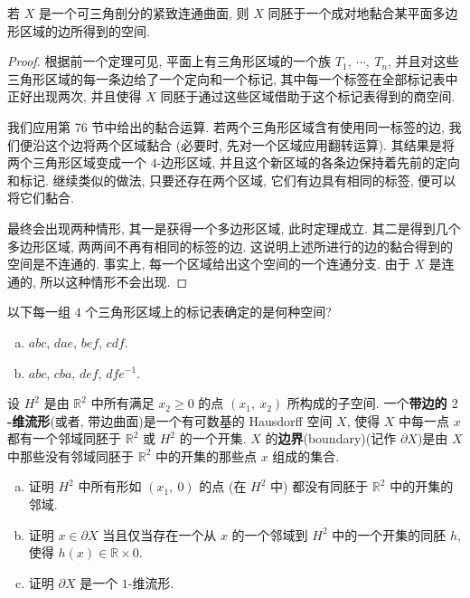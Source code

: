 \begin{theorem}[紧致连通曲面的多边形表示]
\label{theorem:ch12-polygon-representation}
若 $X$ 是一个可三角剖分的紧致连通曲面, 则 $X$ 同胚于一个成对地黏合某平面多边形区域的边所得到的空间.
\end{theorem}

\begin{proof}
根据前一个定理可见, 平面上有三角形区域的一个族 $T_{1},\ \cdots,\ T_{n}$, 并且对这些三角形区域的每一条边给了一个定向和一个标记, 其中每一个标签在全部标记表中正好出现两次, 并且使得 $X$ 同胚于通过这些区域借助于这个标记表得到的商空间.

我们应用第 76 节中给出的黏合运算. 若两个三角形区域含有使用同一标签的边, 我们便沿这个边将两个区域黏合 (必要时, 先对一个区域应用翻转运算). 其结果是将两个三角形区域变成一个 $4$-边形区域, 并且这个新区域的各条边保持着先前的定向和标记. 继续类似的做法, 只要还存在两个区域, 它们有边具有相同的标签, 便可以将它们黏合.

最终会出现两种情形, 其一是获得一个多边形区域, 此时定理成立. 其二是得到几个多边形区域, 两两间不再有相同的标签的边. 这说明上述所进行的边的黏合得到的空间是不连通的. 事实上, 每一个区域给出这个空间的一个连通分支. 由于 $X$ 是连通的, 所以这种情形不会出现.
\end{proof}

\begin{exercise}
\label{exercise:ch12-sec78-01}
以下每一组 $4$ 个三角形区域上的标记表确定的是何种空间?
\begin{enumerate}[(a)]
\item $abc$, $dae$, $bef$, $cdf$.
\item $abc$, $cba$, $def$, $dfe^{-1}$.
\end{enumerate}
\end{exercise}

\begin{exercise}
\label{exercise:ch12-sec78-02}
设 $H^{2}$ 是由 $\mathbb{R}^{2}$ 中所有满足 $x_{2}\geqslant 0$ 的点 $(x_{1},\ x_{2})$ 所构成的子空间. 一个\textbf{带边的 $2$-维流形}(或者, 带边曲面)是一个有可数基的 Hausdorff 空间 $X$, 使得 $X$ 中每一点 $x$ 都有一个邻域同胚于 $\mathbb{R}^{2}$ 或 $H^{2}$ 的一个开集. $X$ 的\textbf{边界}(boundary)(记作 $\partial X$)是由 $X$ 中那些没有邻域同胚于 $\mathbb{R}^{2}$ 中的开集的那些点 $x$ 组成的集合.
\begin{enumerate}[(a)]
\item 证明 $H^{2}$ 中所有形如 $(x_{1},\ 0)$ 的点 (在 $H^{2}$ 中) 都没有同胚于 $\mathbb{R}^{2}$ 中的开集的邻域.
\item 证明 $x\in\partial X$ 当且仅当存在一个从 $x$ 的一个邻域到 $H^{2}$ 中的一个开集的同胚 $h$, 使得 $h(x)\in\mathbb{R}\times 0$.
\item 证明 $\partial X$ 是一个 $1$-维流形.
\end{enumerate}
\end{exercise}

